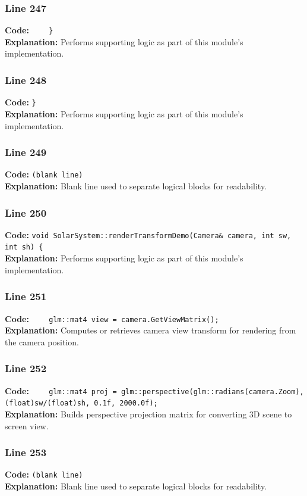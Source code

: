 \documentclass[11pt,a4paper]{article}
\begin{document}
\subsubsection*{Line 247}
\textbf{Code:} \verb|    }|\\
\textbf{Explanation:} Performs supporting logic as part of this module's implementation.

\subsubsection*{Line 248}
\textbf{Code:} \verb|}|\\
\textbf{Explanation:} Performs supporting logic as part of this module's implementation.

\subsubsection*{Line 249}
\textbf{Code:} \texttt{(blank line)}\\
\textbf{Explanation:} Blank line used to separate logical blocks for readability.

\subsubsection*{Line 250}
\textbf{Code:} \verb|void SolarSystem::renderTransformDemo(Camera& camera, int sw, int sh) {|\\
\textbf{Explanation:} Performs supporting logic as part of this module's implementation.

\subsubsection*{Line 251}
\textbf{Code:} \verb|    glm::mat4 view = camera.GetViewMatrix();|\\
\textbf{Explanation:} Computes or retrieves camera view transform for rendering from the camera position.

\subsubsection*{Line 252}
\textbf{Code:} \verb|    glm::mat4 proj = glm::perspective(glm::radians(camera.Zoom), (float)sw/(float)sh, 0.1f, 2000.0f);|\\
\textbf{Explanation:} Builds perspective projection matrix for converting 3D scene to screen view.

\subsubsection*{Line 253}
\textbf{Code:} \texttt{(blank line)}\\
\textbf{Explanation:} Blank line used to separate logical blocks for readability.
\end{document}
